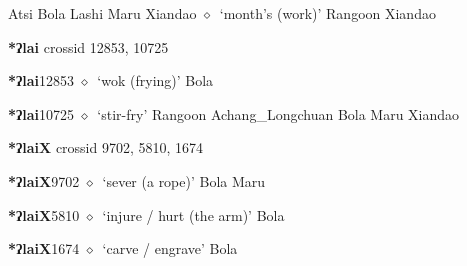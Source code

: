 \begin{list}{}{\leftmargin=1.5em \itemindent=-1.5em}
\hspace{1ex}
         Atsi 
\hspace{1ex}
         Bola 
\hspace{1ex}
         Lashi 
\hspace{1ex}
         Maru 
\hspace{1ex}
         Xiandao 
\hspace{1ex}
         $\diamond$~`month's (work)'
         Rangoon 
\hspace{1ex}
         Xiandao 
  \end{list}
\item
\textbf{*ʔlai}
  {\tiny crossid 12853, 10725}
  \begin{list}{}{\leftmargin=1.5em \itemindent=-1.5em}
  \item {\footnotesize \textbf{*ʔlai}}{\tiny 12853}
         $\diamond$~`wok (frying)'
         Bola 
  \item {\footnotesize \textbf{*ʔlai}}{\tiny 10725}
\hspace{1ex}
         $\diamond$~`stir-fry'
         Rangoon 
\hspace{1ex}
         Achang\_Longchuan 
\hspace{1ex}
         Bola 
\hspace{1ex}
         Maru 
\hspace{1ex}
         Xiandao 
  \end{list}
\item
\textbf{*ʔlaiX}
  {\tiny crossid 9702, 5810, 1674}
  \begin{list}{}{\leftmargin=1.5em \itemindent=-1.5em}
  \item {\footnotesize \textbf{*ʔlaiX}}{\tiny 9702}
         $\diamond$~`sever (a rope)'
         Bola 
\hspace{1ex}
         Maru 
  \item {\footnotesize \textbf{*ʔlaiX}}{\tiny 5810}
\hspace{1ex}
         $\diamond$~`injure / hurt (the arm)'
         Bola 
  \item {\footnotesize \textbf{*ʔlaiX}}{\tiny 1674}
\hspace{1ex}
         $\diamond$~`carve / engrave'
         Bola 
  \end{list}
